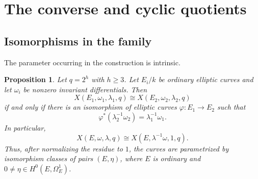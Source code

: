\documentclass[11pt]{article}
\newtheorem{proposition}[theorem]{Proposition}
\theoremstyle{remark}
\begin{document}
\section{The converse and cyclic quotients}\label{sec:families}

\subsection{Isomorphisms in the family}

The parameter occurring in the construction is intrinsic.

\begin{proposition}\label{prop:parameters}
Let $q=2^h$ with $h\ge3$.  Let $E_i/k$ be ordinary elliptic curves and
let $\omega_i$ be nonzero invariant differentials.  Then
\[
 X(E_1,\omega_1,\lambda_1,q)\cong
 X(E_2,\omega_2,\lambda_2,q)
\]
if and only if there is an isomorphism of elliptic curves
$\varphi:E_1\to E_2$ such that
\[
        \varphi^*(\lambda_2^{-1}\omega_2)
        =\lambda_1^{-1}\omega_1.
\]
In particular,
\[
        X(E,\omega,\lambda,q)
        \cong X(E,\lambda^{-1}\omega,1,q).
\]
Thus, after normalizing the residue to $1$, the curves are parametrized
by isomorphism classes of pairs $(E,\eta)$, where $E$ is ordinary and
$0\ne\eta\in H^0(E,\Omega_E^1)$.
\end{proposition}
\end{document}
